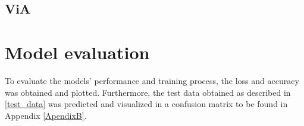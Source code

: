

\subsection{ViA}




\section{Model evaluation}

To evaluate the models' performance and training process, the loss and accuracy was obtained and plotted. Furthermore, the test data obtained as described in \ref{test_data} was predicted and visualized in a confusion matrix to be found in Appendix \ref{ApendixB}.